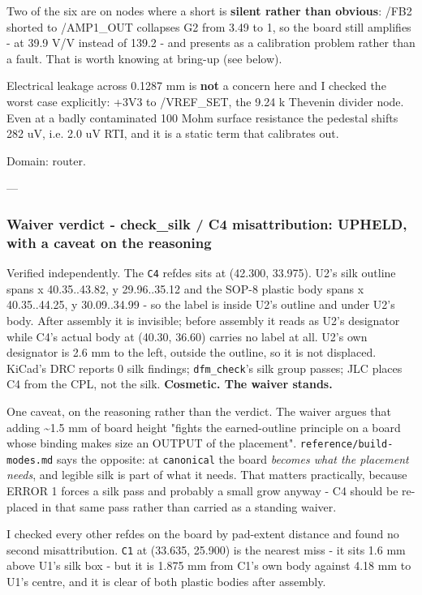 \documentclass[11pt,a4paper]{article}
\begin{document}
Two of the six are on nodes where a short is \textbf{silent rather than obvious}: /FB2 shorted to /AMP1\_OUT collapses G2 from 3.49 to 1, so the board still amplifies - at 39.9 V/V instead of 139.2 - and presents as a calibration problem rather than a fault. That is worth knowing at bring-up (see below).

Electrical leakage across 0.1287 mm is \textbf{not} a concern here and I checked the worst case explicitly: +3V3 to /VREF\_SET, the 9.24 k Thevenin divider node. Even at a badly contaminated 100 Mohm surface resistance the pedestal shifts 282 uV, i.e. 2.0 uV RTI, and it is a static term that calibrates out.

Domain: router.

---

\subsubsection*{Waiver verdict - check\_silk / C4 misattribution: UPHELD, with a caveat on the reasoning}
Verified independently. The \texttt{C4} refdes sits at (42.300, 33.975). U2's silk outline spans x 40.35..43.82, y 29.96..35.12 and the SOP-8 plastic body spans x 40.35..44.25, y 30.09..34.99 - so the label is inside U2's outline and under U2's body. After assembly it is invisible; before assembly it reads as U2's designator while C4's actual body at (40.30, 36.60) carries no label at all. U2's own designator is 2.6 mm to the left, outside the outline, so it is not displaced. KiCad's DRC reports 0 silk findings; \texttt{dfm\_check}'s silk group passes; JLC places C4 from the CPL, not the silk. \textbf{Cosmetic. The waiver stands.}

One caveat, on the reasoning rather than the verdict. The waiver argues that adding \textasciitilde{}1.5 mm of board height "fights the earned-outline principle on a board whose binding makes size an OUTPUT of the placement". \texttt{reference/build-modes.md} says the opposite: at \texttt{canonical} the board \emph{becomes what the placement needs}, and legible silk is part of what it needs. That matters practically, because ERROR 1 forces a silk pass and probably a small grow anyway - C4 should be re-placed in that same pass rather than carried as a standing waiver.

I checked every other refdes on the board by pad-extent distance and found no second misattribution. \texttt{C1} at (33.635, 25.900) is the nearest miss - it sits 1.6 mm above U1's silk box - but it is 1.875 mm from C1's own body against 4.18 mm to U1's centre, and it is clear of both plastic bodies after assembly.
\end{document}
